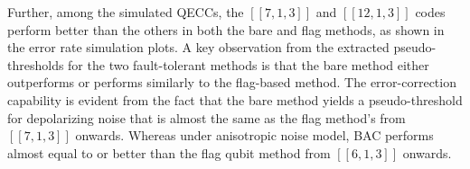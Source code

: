 \documentclass[reprint, amsmath,amssymb, aps,pra,
 floatfix,
]{revtex4-2}
\begin{document}
Further, among the simulated QECCs, the $[[7,1,3]]$ and $[[12,1,3]]$ codes perform better than the others in both the bare and flag methods, as shown in the error rate simulation plots.
A key observation from the extracted pseudo-thresholds for the two fault-tolerant methods is that the bare method either outperforms or performs similarly to the flag-based method.
The error-correction capability is evident from the fact that the bare method yields a pseudo-threshold for depolarizing noise that is almost the same as the flag method's from $[[7,1,3]]$ onwards.
Whereas under anisotropic noise model, BAC performs almost equal to or better than the flag qubit method from $[[6,1,3]]$ onwards.



    
    
    
\end{document}
